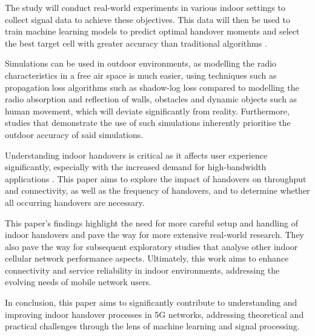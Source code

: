 The study will conduct real-world experiments in various indoor settings to collect signal data to achieve these objectives. This data will then be used to train machine learning models to predict optimal handover moments and select the best target cell with greater accuracy than traditional algorithms \insertref.

Simulations can be used in outdoor environments, as modelling the radio characteristics in a free air space is much easier, using techniques such as propagation loss algorithms such as shadow-log loss \insertref compared to modelling the radio absorption and reflection of walls, obstacles and dynamic objects such as human movement, which will deviate significantly from reality. Furthermore, studies that demonstrate the use of such simulations inherently prioritise the outdoor accuracy of said simulations. 

Understanding indoor handovers is critical as it affects user experience significantly, especially with the increased demand for high-bandwidth applications \insertref. This paper aims to explore the impact of handovers on throughput and connectivity, as well as the frequency of handovers, and to determine whether all occurring handovers are necessary. 

This paper's findings highlight the need for more careful setup and handling of indoor handovers and pave the way for more extensive real-world research. They also pave the way for subsequent exploratory studies that analyse other indoor cellular network performance aspects. Ultimately, this work aims to enhance connectivity and service reliability in indoor environments, addressing the evolving needs of mobile network users.

In conclusion, this paper aims to significantly contribute to understanding and improving indoor handover processes in 5G networks, addressing theoretical and practical challenges through the lens of machine learning and signal processing.

